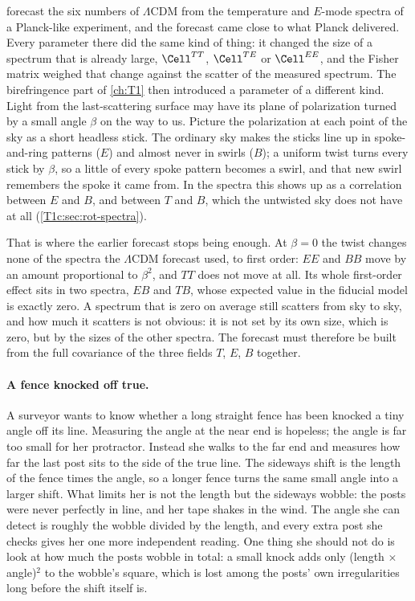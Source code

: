  forecast the six numbers of $\Lambda$CDM from the temperature and $E$-mode spectra of a
Planck-like experiment, and the forecast came close to what Planck delivered. Every parameter there did the same
kind of thing: it changed the size of a spectrum that is already large, $\Cell^{TT}$, $\Cell^{TE}$ or $\Cell^{EE}$, and
the Fisher matrix weighed that change against the scatter of the measured spectrum. The birefringence part of
\cref{ch:T1} then introduced a parameter of a different kind. Light from the last-scattering surface may have its
plane of polarization turned by a small angle $\beta$ on the way to us. Picture the polarization at each point of
the sky as a short headless stick. The ordinary sky makes the sticks line up in spoke-and-ring patterns ($E$) and
almost never in swirls ($B$); a uniform twist turns every stick by $\beta$, so a little of every spoke pattern
becomes a swirl, and that new swirl remembers the spoke it came from. In the spectra this shows up as a
correlation between $E$ and $B$, and between $T$ and $B$, which the untwisted sky does not have at all
(\cref{T1c:sec:rot-spectra}).

That is where the earlier forecast stops being enough. At $\beta=0$ the twist changes none of the spectra the
$\Lambda$CDM forecast used, to first order: $EE$ and $BB$ move by an amount proportional to $\beta^2$, and $TT$ does
not move at all. Its whole first-order effect sits in two spectra, $EB$ and $TB$, whose expected value in the
fiducial model is exactly zero. A spectrum that is zero on average still scatters from sky to sky, and how much it
scatters is not obvious: it is not set by its own size, which is zero, but by the sizes of the other spectra. The
forecast must therefore be built from the full covariance of the three fields $T$, $E$, $B$ together.

\paragraph{A fence knocked off true.} A surveyor wants to know whether a long straight fence has been knocked a
tiny angle off its line. Measuring the angle at the near end is hopeless; the angle is far too small for her
protractor. Instead she walks to the far end and measures how far the last post sits to the side of the true line.
The sideways shift is the length of the fence times the angle, so a longer fence turns the same small angle into a
larger shift. What limits her is not the length but the sideways wobble: the posts were never perfectly in line,
and her tape shakes in the wind. The angle she can detect is roughly the wobble divided by the length, and every
extra post she checks gives her one more independent reading. One thing she should not do is look at how much the
posts wobble in total: a small knock adds only (length $\times$ angle)$^2$ to the wobble's square, which is lost
among the posts' own irregularities long before the shift itself is.


